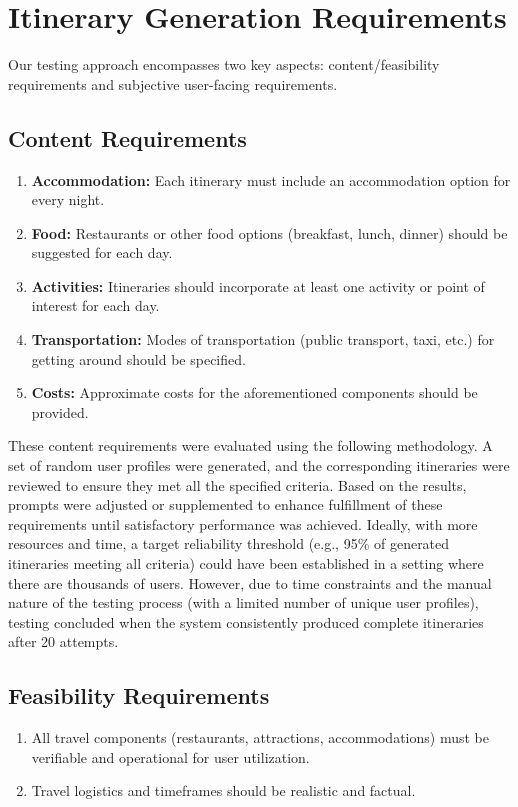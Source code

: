 \documentclass[12pt,a4paper]{report}
\begin{document}
\section{Itinerary Generation Requirements}

Our testing approach encompasses two key aspects: content/feasibility requirements and subjective user-facing requirements.

\subsection{Content Requirements}

\begin{enumerate}
\item{\textbf{Accommodation:} Each itinerary must include an accommodation option for every night.}
\item{\textbf{Food:} Restaurants or other food options (breakfast, lunch, dinner) should be suggested for each day.}
\item{\textbf{Activities:} Itineraries should incorporate at least one activity or point of interest for each day.}
\item{\textbf{Transportation:} Modes of transportation (public transport, taxi, etc.) for getting around should be specified.}
\item{\textbf{Costs:} Approximate costs for the aforementioned components should be provided.}
\end{enumerate}
These content requirements were evaluated using the following methodology. A set of random user profiles were generated, and the corresponding itineraries were reviewed to ensure they met all the specified criteria. Based on the results, prompts were adjusted or supplemented to enhance fulfillment of these requirements until satisfactory performance was achieved. Ideally, with more resources and time, a target reliability threshold (e.g., 95\% of generated itineraries meeting all criteria) could have been established in a setting where there are thousands of users. However, due to time constraints and the manual nature of the testing process (with a limited number of unique user profiles), testing concluded when the system consistently produced complete itineraries after 20 attempts.

\subsection{Feasibility Requirements}
\begin{enumerate}
\item{All travel components (restaurants, attractions, accommodations) must be verifiable and operational for user utilization.}
\item{Travel logistics and timeframes should be realistic and factual.}
\end{enumerate}
\end{document}
